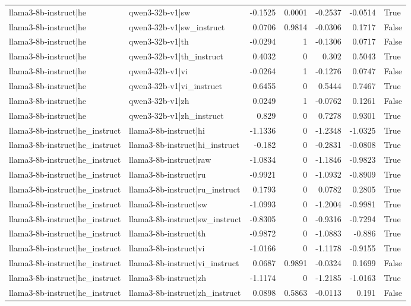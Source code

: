 \begin{table}
\begin{tabular}{l l r r r r l}
llama3-8b-instruct|he & qwen3-32b-v1|sw & -0.1525 & 0.0001 & -0.2537 & -0.0514 & True \\
llama3-8b-instruct|he & qwen3-32b-v1|sw_instruct & 0.0706 & 0.9814 & -0.0306 & 0.1717 & False \\
llama3-8b-instruct|he & qwen3-32b-v1|th & -0.0294 & 1 & -0.1306 & 0.0717 & False \\
llama3-8b-instruct|he & qwen3-32b-v1|th_instruct & 0.4032 & 0 & 0.302 & 0.5043 & True \\
llama3-8b-instruct|he & qwen3-32b-v1|vi & -0.0264 & 1 & -0.1276 & 0.0747 & False \\
llama3-8b-instruct|he & qwen3-32b-v1|vi_instruct & 0.6455 & 0 & 0.5444 & 0.7467 & True \\
llama3-8b-instruct|he & qwen3-32b-v1|zh & 0.0249 & 1 & -0.0762 & 0.1261 & False \\
llama3-8b-instruct|he & qwen3-32b-v1|zh_instruct & 0.829 & 0 & 0.7278 & 0.9301 & True \\
llama3-8b-instruct|he_instruct & llama3-8b-instruct|hi & -1.1336 & 0 & -1.2348 & -1.0325 & True \\
llama3-8b-instruct|he_instruct & llama3-8b-instruct|hi_instruct & -0.182 & 0 & -0.2831 & -0.0808 & True \\
llama3-8b-instruct|he_instruct & llama3-8b-instruct|raw & -1.0834 & 0 & -1.1846 & -0.9823 & True \\
llama3-8b-instruct|he_instruct & llama3-8b-instruct|ru & -0.9921 & 0 & -1.0932 & -0.8909 & True \\
llama3-8b-instruct|he_instruct & llama3-8b-instruct|ru_instruct & 0.1793 & 0 & 0.0782 & 0.2805 & True \\
llama3-8b-instruct|he_instruct & llama3-8b-instruct|sw & -1.0993 & 0 & -1.2004 & -0.9981 & True \\
llama3-8b-instruct|he_instruct & llama3-8b-instruct|sw_instruct & -0.8305 & 0 & -0.9316 & -0.7294 & True \\
llama3-8b-instruct|he_instruct & llama3-8b-instruct|th & -0.9872 & 0 & -1.0883 & -0.886 & True \\
llama3-8b-instruct|he_instruct & llama3-8b-instruct|vi & -1.0166 & 0 & -1.1178 & -0.9155 & True \\
llama3-8b-instruct|he_instruct & llama3-8b-instruct|vi_instruct & 0.0687 & 0.9891 & -0.0324 & 0.1699 & False \\
llama3-8b-instruct|he_instruct & llama3-8b-instruct|zh & -1.1174 & 0 & -1.2185 & -1.0163 & True \\
llama3-8b-instruct|he_instruct & llama3-8b-instruct|zh_instruct & 0.0898 & 0.5863 & -0.0113 & 0.191 & False \\

\end{tabular}
\end{table}
